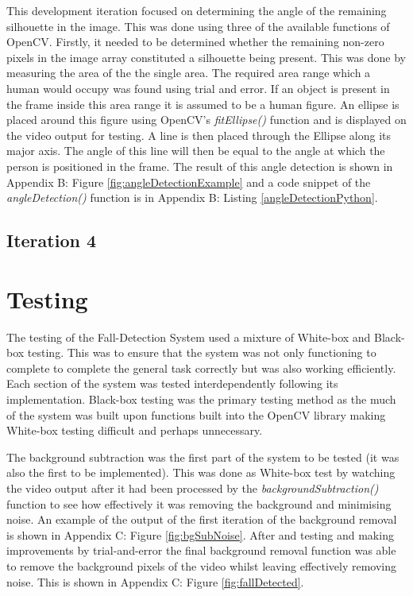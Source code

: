 \documentclass[11pt,a4paper]{report}
\begin{document}
This development iteration focused on determining the angle of the remaining silhouette in the image. This was done using three of the available functions of OpenCV. Firstly, it needed to be determined whether the remaining non-zero pixels in the image array constituted a silhouette being present. This was done by measuring the area of the the single area. The required area range which a human would occupy was found using trial and error. If an object is present in the frame inside this area range it is assumed to be a human figure. An ellipse is placed around this figure using OpenCV's \textit{fitEllipse()} function and is displayed on the video output for testing. A line is then placed through the Ellipse along its major axis. The angle of this line will then be equal to the angle at which the person is positioned in the frame. The result of this angle detection is shown in Appendix B: Figure \ref{fig:angleDetectionExample} and a code snippet of the \textit{angleDetection()} function is in Appendix B: Listing \ref{angleDetectionPython}.

\subsection{Iteration 4}


\pagebreak
\section{Testing}
The testing of the Fall-Detection System used a mixture of White-box and Black-box testing. This was to ensure that the system was not only functioning to complete to complete the general task correctly but was also working efficiently. Each section of the system was tested interdependently following its implementation. Black-box testing was the primary testing method as the much of the system was built upon functions built into the OpenCV library making White-box testing difficult and perhaps unnecessary.

The background subtraction was the first part of the system to be tested (it was also the first to be implemented). This was done as White-box test by watching the video output after it had been processed by the \textit{backgroundSubtraction()} function to see how effectively it was removing the background and minimising noise. An example of the output of the first iteration of the background removal is shown in Appendix C: Figure \ref{fig:bgSubNoise}. After and testing and making improvements by trial-and-error the final background removal function was able to remove the background pixels of the video whilst leaving effectively removing noise. This is shown in Appendix C: Figure \ref{fig:fallDetected}.
\end{document}
